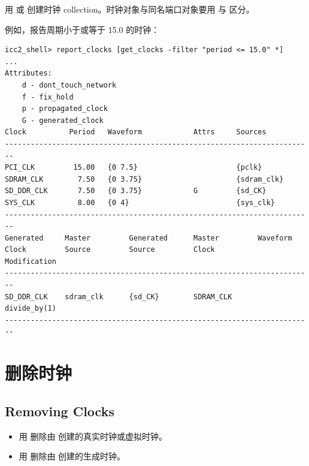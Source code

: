 用  或  创建时钟 collection。时钟对象与同名端口对象要用  与  区分。

例如，报告周期小于或等于 15.0 的时钟：
\begin{lstlisting}
icc2_shell> report_clocks [get_clocks -filter "period <= 15.0" *]
...
Attributes:
    d - dont_touch_network
    f - fix_hold
    p - propagated_clock
    G - generated_clock
Clock          Period   Waveform            Attrs     Sources
------------------------------------------------------------------------
PCI_CLK         15.00   {0 7.5}                       {pclk}
SDRAM_CLK        7.50   {0 3.75}                      {sdram_clk}
SD_DDR_CLK       7.50   {0 3.75}            G         {sd_CK}
SYS_CLK          8.00   {0 4}                         {sys_clk}
------------------------------------------------------------------------
Generated     Master         Generated      Master         Waveform
Clock         Source         Source         Clock          Modification
------------------------------------------------------------------------
SD_DDR_CLK    sdram_clk      {sd_CK}        SDRAM_CLK      divide_by(1)
------------------------------------------------------------------------
\end{lstlisting}

\section{删除时钟}
\subsection*{Removing Clocks}

\begin{itemize}
  \item 用  删除由  创建的真实时钟或虚拟时钟。
  \item 用  删除由  创建的生成时钟。
\end{itemize}
